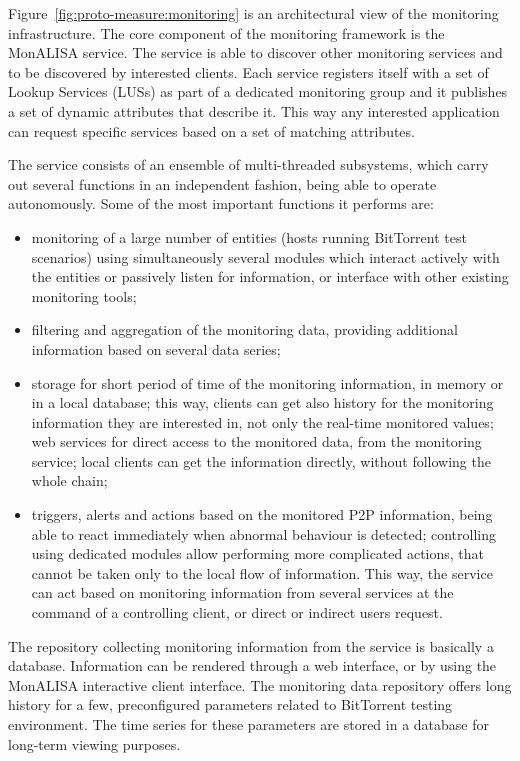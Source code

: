 Figure~\ref{fig:proto-measure:monitoring} is an architectural view of the
monitoring infrastructure. The core component of the monitoring framework is
the MonALISA service. The service is able to discover other monitoring
services and to be discovered by interested clients. Each service registers
itself with a set of Lookup Services (LUSs) as part of a dedicated monitoring
group and it publishes a set of dynamic attributes that describe it. This way
any interested application can request specific services based on a set of
matching attributes.

The service consists of an ensemble of multi-threaded subsystems,
which carry out several functions in an independent fashion, being able to
operate autonomously. Some of the most important functions it
performs are:

\begin{itemize}
  \item monitoring of a large number of entities (hosts running BitTorrent
  test scenarios) using simultaneously several modules which interact actively
  with the entities or passively listen for information, or interface with
  other existing monitoring tools;
  \item filtering and aggregation of the monitoring data, providing additional
  information based on several data series;
  \item storage for short period of time of the monitoring information, in
  memory or in a local database; this way, clients can get also history for
  the monitoring information they are interested in, not only the real-time
  monitored values; web services for direct access to the monitored data, from
  the monitoring service; local clients can get the information directly,
  without following the whole chain;
  \item triggers, alerts and actions based on the monitored P2P information,
  being able to react immediately when abnormal behaviour is detected;
  controlling using dedicated modules allow performing more complicated
  actions, that cannot be taken only to the local flow of information. This
  way, the service can act based on monitoring information from several
  services at the command of a controlling client, or direct or indirect users
  request.
\end{itemize}

The repository collecting monitoring information from the service is basically
a database. Information can be rendered through a web interface, or by using
the MonALISA interactive client interface. The monitoring data repository
offers long history for a few, preconfigured parameters related to BitTorrent
testing environment. The time series for these parameters are stored in a
database for long-term viewing purposes.

